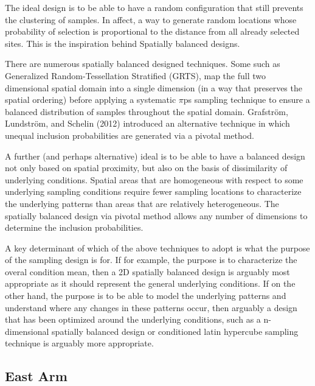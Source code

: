 \documentclass[a4paper]{article}
\begin{document}
The ideal design is to be able to have a random configuration that still
prevents the clustering of samples. In affect, a way to generate random
locations whose probability of selection is proportional to the distance
from all already selected sites. This is the inspiration behind
Spatially balanced designs.

There are numerous spatially balanced designed techniques. Some such as
Generalized Random-Tessellation Stratified (GRTS), map the full two
dimensional spatial domain into a single dimension (in a way that
preserves the spatial ordering) before applying a systematic \(\pi\)ps
sampling technique to ensure a balanced distribution of samples
throughout the spatial domain. Grafström, Lundström, and Schelin (2012)
introduced an alternative technique in which unequal inclusion
probabilities are generated via a pivotal method.

A further (and perhaps alternative) ideal is to be able to have a
balanced design not only based on spatial proximity, but also on the
basis of dissimilarity of underlying conditions. Spatial areas that are
homogeneous with respect to some underlying sampling conditions require
fewer sampling locations to characterize the underlying patterns than
areas that are relatively heterogeneous. The spatially balanced design
via pivotal method allows any number of dimensions to determine the
inclusion probabilities.

A key determinant of which of the above techniques to adopt is what the
purpose of the sampling design is for. If for example, the purpose is to
characterize the overal condition mean, then a 2D spatially balanced
design is arguably most appropriate as it should represent the general
underlying conditions. If on the other hand, the purpose is to be able
to model the underlying patterns and understand where any changes in
these patterns occur, then arguably a design that has been optimized
around the underlying conditions, such as a n-dimensional spatially
balanced design or conditioned latin hypercube sampling technique is
arguably more appropriate.

\hypertarget{east-arm-1}{%
\subsection{East Arm}\label{east-arm-1}}
\end{document}
